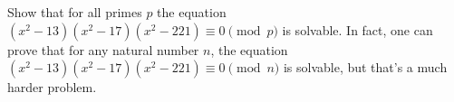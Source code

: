 \section{}

Show that for all primes $p$ the equation 
$(x^2 - 13)(x^2-17)(x^2-221) \equiv 0 \pmod p$ is solvable. In fact, one can
prove that for any natural number $n$, the equation 
$(x^2 - 13)(x^2-17)(x^2-221) \equiv 0 \pmod n$ is solvable, but that's a much
harder problem.

